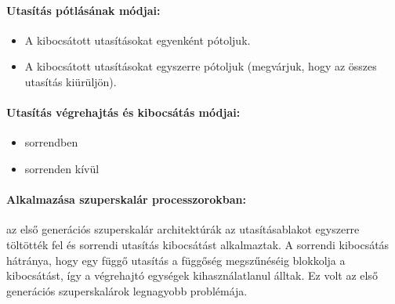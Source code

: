\paragraph{Utasítás pótlásának módjai:}
\begin{itemize}
    \item A kibocsátott utasításokat egyenként pótoljuk.
    \item A kibocsátott utasításokat egyszerre pótoljuk (megvárjuk, hogy az összes utasítás kiürüljön).
\end{itemize}
\paragraph{Utasítás végrehajtás és kibocsátás módjai:}
\begin{itemize}
    \item sorrendben
    \item sorrenden kívül
\end{itemize}
\paragraph{Alkalmazása szuperskalár processzorokban:} az első generációs szuperskalár architektúrák az utasításablakot egyszerre töltötték fel és sorrendi utasítás kibocsátást alkalmaztak.
A sorrendi kibocsátás hátránya, hogy egy függő utasítás a függőség megszűnéséig blokkolja a kibocsátást, így a végrehajtó egységek kihasználatlanul álltak.
Ez volt az első generációs szuperskalárok legnagyobb problémája.
